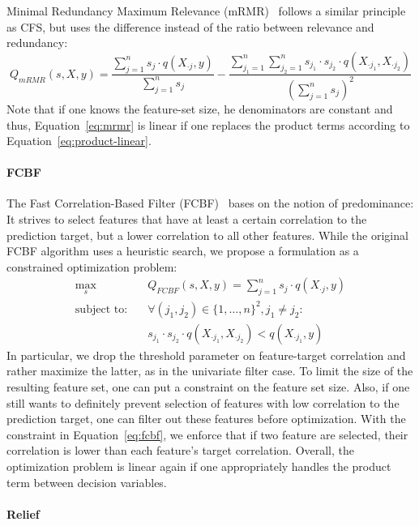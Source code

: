 \documentclass{article}
\theoremstyle{definition}
\begin{document}
Minimal Redundancy Maximum Relevance (mRMR)~\cite{peng2005feature} follows a similar principle as CFS, but uses the difference instead of the ratio between relevance and redundancy:
%
\begin{equation}
	Q_{mRMR}(s,X,y) = \frac{\sum_{j=1}^{n} s_j \cdot q(X_{\cdot{}j},y)}{\sum_{j=1}^{n} s_j} - \frac{\sum_{j_1=1}^{n} \sum_{j_2=1}^{n} s_{j_1} \cdot s_{j_2} \cdot q(X_{\cdot{}j_1}, X_{\cdot{}j_2})}{(\sum_{j=1}^{n} s_j)^2}
	\label{eq:mrmr}
\end{equation}
%
Note that if one knows the feature-set size, he denominators are constant and thus, Equation~\ref{eq:mrmr} is linear if one replaces the product terms according to Equation~\ref{eq:product-linear}.

\paragraph{FCBF}

The Fast Correlation-Based Filter (FCBF)~\cite{yu2003feature} bases on the notion of predominance:
It strives to select features that have at least a certain correlation to the prediction target, but a lower correlation to all other features.
While the original FCBF algorithm uses a heuristic search, we propose a formulation as a constrained optimization problem:
%
\begin{align}
	\max_s &\quad Q_{FCBF}(s,X,y) = \sum_{j=1}^{n} s_j \cdot q(X_{\cdot{}j},y) \nonumber \\
	\text{subject to:} &\quad \forall (j_1,j_2) \in \{1, \dots, n\}^2, j_1 \neq j_2: \nonumber \\
	&\quad s_{j_1} \cdot s_{j_2} \cdot q(X_{\cdot{}j_1}, X_{\cdot{}j_2}) < q(X_{\cdot{}j_1},y)
	\label{eq:fcbf}
\end{align}
%
In particular, we drop the threshold parameter on feature-target correlation and rather maximize the latter, as in the univariate filter case.
To limit the size of the resulting feature set, one can put a constraint on the feature set size.
Also, if one still wants to definitely prevent selection of features with low correlation to the prediction target, one can filter out these features before optimization.
With the constraint in Equation~\ref{eq:fcbf}, we enforce that if two feature are selected, their correlation is lower than each feature's target correlation.
Overall, the optimization problem is linear again if one appropriately handles the product term between decision variables.

\paragraph{Relief}
\end{document}
